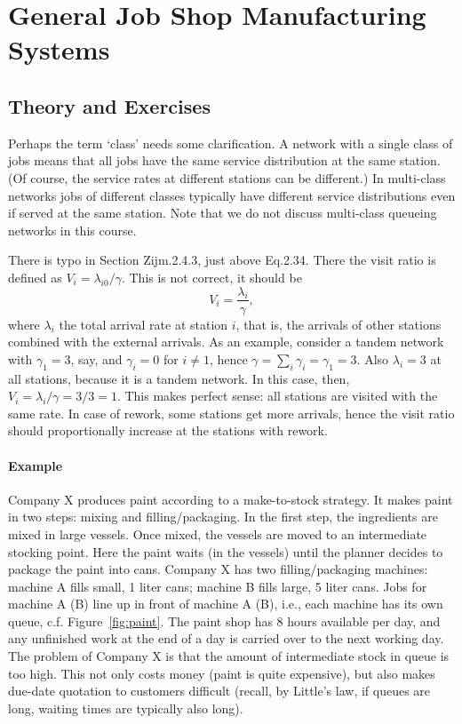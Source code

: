 

\section{General Job Shop Manufacturing Systems}
\label{sec:general-job-shop}

\subsection*{Theory and Exercises}


Perhaps the term `class' needs some clarification. A network with a
single class of jobs means that all jobs have the same service
distribution at the same station. (Of course, the service rates at
different stations can be different.) In multi-class networks jobs of
different classes typically have different service distributions even
if served at the same station. Note that we do not discuss multi-class
queueing networks in this course.

There is typo in Section Zijm.2.4.3, just above Eq.2.34. There the visit ratio is defined as $V_i=\lambda_{i0}/\gamma$. This is not correct, it should be
\begin{equation*}
  V_i = \frac{\lambda_i}{\gamma},
\end{equation*}
where $\lambda_i$ the total arrival rate at station $i$, that is, the
arrivals of other stations combined with the external arrivals. As an
example, consider a tandem network with $\gamma_{1} = 3$, say, and
$\gamma_i=0$ for $i\neq 1$, hence
$\gamma=\sum_i \gamma_i = \gamma_1 = 3$. Also $\lambda_i = 3$ at all
stations, because it is a tandem network. In this case, then,
$V_i = \lambda_i/\gamma = 3/3 = 1$. This makes perfect sense: all
stations are visited with the same rate.  In case of rework, some
stations get more arrivals, hence the visit ratio should
proportionally increase at the stations with rework.

\paragraph{Example}

Company X produces paint according to a make-to-stock strategy. It
makes paint in two steps: mixing and filling/packaging. In the first
step, the ingredients are mixed in large vessels. Once mixed, the
vessels are moved to an intermediate stocking point. Here the paint
waits (in the vessels) until the planner decides to package the paint
into cans. Company X has two filling/packaging machines: machine A
fills small, 1 liter cans; machine B fills large, 5 liter cans. Jobs
for machine A (B) line up in front of machine A (B), i.e., each
machine has its own queue, c.f. Figure~\ref{fig:paint}. The paint shop
has 8 hours available per day, and any unfinished work at the end of a
day is carried over to the next working day. The problem of Company X
is that the amount of intermediate stock in queue is too high. This
not only costs money (paint is quite expensive), but also makes
due-date quotation to customers difficult (recall, by Little's law, if
queues are long, waiting times are typically also long).


